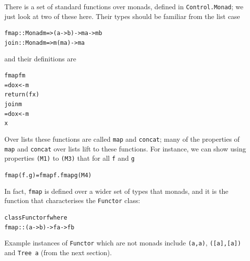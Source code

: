 There is a set of standard functions over monads, defined in \texttt{Control.Monad}; we just look at two of these here. Their types should be
familiar from the list case
\begin{alltt}
fmap :: Monad m => (a -> b) -> m a -> m b
join :: Monad m => m (m a) -> m a
\end{alltt}
and their definitions are
\begin{alltt}
fmap f m 
  = do x <- m 
       return (f x)
join m  
  = do x <- m
       x
\end{alltt}
Over lists these functions are called \texttt{map} and \texttt{concat};
many of the properties of \texttt{map} and \texttt{concat} over lists lift to these
functions. For instance, we can show using properties \texttt{(M1)} to \texttt{(M3)}
that for all \texttt{f} and \texttt{g}
\begin{alltt}
fmap (f.g) = fmap f . fmap g\hfill(M4)
\end{alltt}
In fact, \texttt{fmap} is defined over a wider set of types that monads, and it is the function that characterises the \texttt{Functor} class:
\begin{alltt}
class Functor f where
  fmap :: (a -> b) -> f a -> f b
\end{alltt}
Example instances of \texttt{Functor} which are not monads include \texttt{(a,a)}, \texttt{([a],[a])} and \texttt{Tree a} (from the next section).


